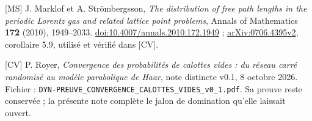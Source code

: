 \documentclass[11pt,a4paper]{article}
\begin{document}
[MS] J. Marklof et A. Strömbergsson, \textit{The distribution of free path lengths in the periodic Lorentz gas and related lattice point problems}, Annals of Mathematics \textbf{172} (2010), 1949--2033. \href{https://doi.org/10.4007/annals.2010.172.1949}{doi:10.4007/annals.2010.172.1949} ; \href{https://arxiv.org/pdf/0706.4395}{arXiv:0706.4395v2}, corollaire 5.9, utilisé et vérifié dans [CV].

[CV] P. Royer, \textit{Convergence des probabilités de calottes vides : du réseau carré randomisé au modèle parabolique de Haar}, note distincte v0.1, 8 octobre 2026. Fichier : \texttt{DYN-PREUVE\_CONVERGENCE\_CALOTTES\_VIDES\_v0\_1.pdf}. Sa preuve reste conservée ; la présente note complète le jalon de domination qu'elle laissait ouvert.
\end{document}

